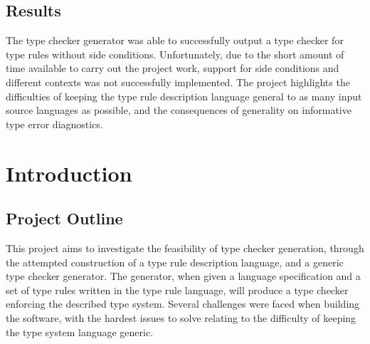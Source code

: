 \documentclass{UoYCSproject}
\begin{document}
\begin{summary}
    \section{Results}
    The type checker generator was able to successfully output a type checker for
    type rules without side conditions. Unfortunately, due to the short amount
    of time available to carry out the project work, support for side conditions
    and different contexts was not successfully implemented. The project
    highlights the difficulties of keeping the type rule description language
    general to as many input source languages as possible, and the consequences
    of generality on informative type error diagnostics.

\end{summary}

\chapter{Introduction}

\section{Project Outline}
This project aims to investigate the feasibility of type checker generation,
through the attempted construction of a type rule description language, and a
generic type checker generator. The generator, when given a language specification 
and a set of type rules written in the type rule language, will produce a 
type checker enforcing the described type system. Several challenges were faced 
when building the software, with the hardest issues to solve relating to the 
difficulty of keeping the type system language generic.
\end{document}
